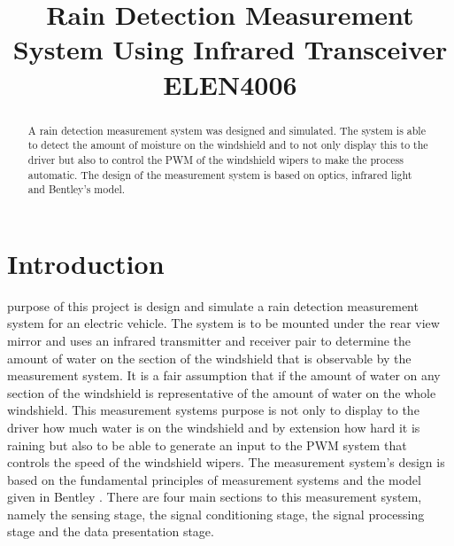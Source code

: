 \documentclass[conference, 11pt]{IEEEtran}
\begin{document}
\title{Rain Detection Measurement System Using Infrared Transceiver\\
{\footnotesize \textsuperscript{}ELEN4006}
}

\author{
\and
{}
}

\maketitle

\begin{abstract}
A rain detection measurement system was designed and simulated. The system is able to detect the amount of moisture on the windshield and to not only display this to the driver but also to control the PWM of the windshield wipers to make the process automatic. The design of the measurement system is based on optics, infrared light and Bentley's model. 
\end{abstract}



\section{Introduction}
 purpose of this project is design and simulate a rain detection measurement system for an electric vehicle. The system is to be mounted under the rear view mirror and uses an infrared transmitter and receiver pair to determine the amount of water on the section of the windshield that is observable by the measurement system. It is a fair assumption that if the amount of water on any section of the windshield is representative of the amount of water on the whole windshield. This measurement systems purpose is not only to display to the driver how much water is on the windshield and by extension how hard it is raining but also to be able to generate an input to the PWM system that controls the speed of the windshield wipers. The measurement system's design is based on the fundamental principles of measurement systems and the model given in Bentley \cite{BENT}. There are four main sections to this measurement system, namely the sensing stage, the signal conditioning stage, the signal processing stage and the data presentation stage. \\
\end{document}
